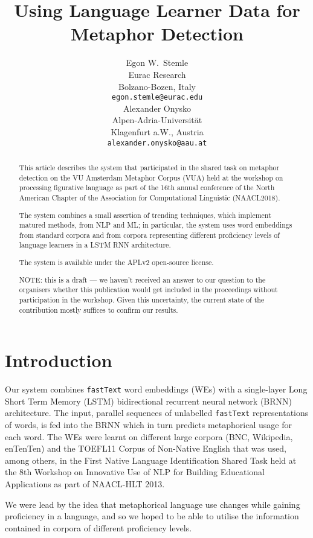 \documentclass[11pt,a4paper]{article}
\title{Using Language Learner Data for Metaphor Detection}
\author{Egon W.~Stemle \\
  Eurac Research \\ 
  Bolzano-Bozen, Italy \\
  {\tt egon.stemle@eurac.edu} \\\And
  Alexander Onysko \\
  Alpen-Adria-Universität \\
  Klagenfurt a.W., Austria \\
  {\tt alexander.onysko@aau.at} \\}
\date{}
\newcommand\fT{\texttt{fastText}\xspace}
\begin{document}
\maketitle
\begin{abstract}
This article describes the system that participated in the shared task on metaphor detection on the VU Amsterdam Metaphor Corpus (VUA) held at the workshop on processing figurative language as part of the 16th annual conference of the North American Chapter of the Association for Computational Linguistic (NAACL2018).

The system combines a small assertion of trending techniques, which implement matured methods, from NLP and ML; in particular, the system uses word embeddings from standard corpora and from corpora representing different proficiency levels of language learners in a LSTM RNN architecture.

The system is available under the APLv2 open-source license.

NOTE: this is a draft --- we haven't received an answer to our question to the organisers whether this publication would get included in the proceedings without participation in the workshop. Given this uncertainty, the current state of the contribution mostly suffices to confirm our results.

\end{abstract}


\section{Introduction} %
\label{sec:intro}

Our system combines \fT \cite{bojanowski2016enriching} word embeddings (WEs) with a
single-layer Long Short Term Memory (LSTM) bidirectional recurrent neural network (BRNN)
architecture.
The input, parallel sequences of unlabelled \fT representations of words, is fed into the
BRNN which in turn predicts metaphorical usage for each word. The WEs were learnt on different large corpora (BNC, Wikipedia, enTenTen) and the TOEFL11 Corpus of Non-Native English\cite{ETS2:ETS202331} that was used, among others, in the First Native Language Identification Shared Task\cite{tetreault-blanchard-cahill:2013:BEA}
 held at the 8th Workshop on Innovative Use of NLP for Building Educational Applications as part of NAACL-HLT 2013.

We were lead by the idea that metaphorical language use changes while gaining proficiency in a language, and so we hoped to be able to utilise the information contained in corpora of different proficiency levels.
\end{document}
